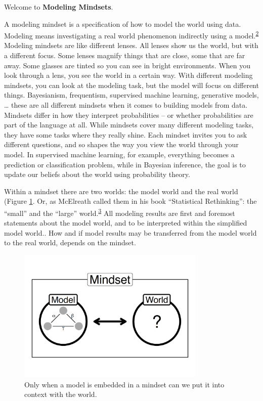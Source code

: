 \documentclass[
  10pt,
]{scrbook}
\begin{document}
Welcome to \textbf{Modeling Mindsets}.

A modeling mindset is a specification of how to model the world using data.
Modeling means investigating a real world phenomenon indirectly using a model.\textsuperscript{\protect\hyperlink{ref-weisberg2007modeler}{2}}
Modeling mindsets are like different lenses.
All lenses show us the world, but with a different focus.
Some lenses magnify things that are close, some that are far away.
Some glasses are tinted so you can see in bright environments.
When you look through a lens, you see the world in a certain way.
With different modeling mindsets, you can look at the modeling task, but the model will focus on different things.
Bayesianism, frequentism, supervised machine learning, generative models, \ldots{} these are all different mindsets when it comes to building models from data.
Mindsets differ in how they interpret probabilities -- or whether probabilities are part of the language at all.
While mindsets cover many different modeling tasks, they have some tasks where they really shine.
Each mindset invites you to ask different questions, and so shapes the way you view the world through your model.
In supervised machine learning, for example, everything becomes a prediction or classification problem, while in Bayesian inference, the goal is to update our beliefs about the world using probability theory.

Within a mindset there are two worlds: the model world and the real world (Figure \ref{fig:mindsets}.
Or, as McElreath called them in his book ``Statistical Rethinking'': the ``small'' and the ``large'' world.\textsuperscript{\protect\hyperlink{ref-mcelreath2020statistical}{3}}
All modeling results are first and foremost statements about the model world, and to be interpreted within the simplified model world..
How and if model results may be transferred from the model world to the real world, depends on the mindset.

\begin{figure}

{\centering \includegraphics[width=0.8\textwidth]{figures/mindsets-1} 

}

\caption{Only when a model is embedded in a mindset can we put it into context with the world.}\label{fig:mindsets}
\end{figure}
\end{document}

